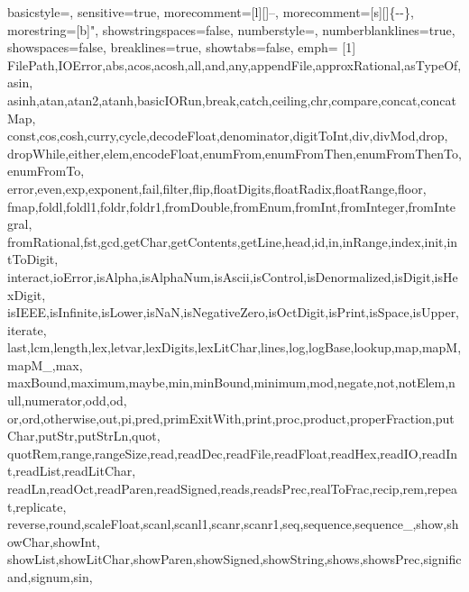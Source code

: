 \renewcommand{\ttdefault}{pcr}
 {
        basicstyle=\ttfamily\small,
        sensitive=true,
        morecomment=[l][\ttfamily\tiny]{--},
        morecomment=[s][\ttfamily\tiny]{\{-}{-\}},
        morestring=[b]",
        showstringspaces=false,
        numberstyle=\tiny,
        numberblanklines=true,
        showspaces=false,
        breaklines=true,
        showtabs=false,
        emph=
        {[1]
                FilePath,IOError,abs,acos,acosh,all,and,any,appendFile,approxRational,asTypeOf,asin,
                asinh,atan,atan2,atanh,basicIORun,break,catch,ceiling,chr,compare,concat,concatMap,
                const,cos,cosh,curry,cycle,decodeFloat,denominator,digitToInt,div,divMod,drop,
                dropWhile,either,elem,encodeFloat,enumFrom,enumFromThen,enumFromThenTo,enumFromTo,
                error,even,exp,exponent,fail,filter,flip,floatDigits,floatRadix,floatRange,floor,
                fmap,foldl,foldl1,foldr,foldr1,fromDouble,fromEnum,fromInt,fromInteger,fromIntegral,
                fromRational,fst,gcd,getChar,getContents,getLine,head,id,in,inRange,index,init,intToDigit,
                interact,ioError,isAlpha,isAlphaNum,isAscii,isControl,isDenormalized,isDigit,isHexDigit,
                isIEEE,isInfinite,isLower,isNaN,isNegativeZero,isOctDigit,isPrint,isSpace,isUpper,iterate,
                last,lcm,length,lex,letvar,lexDigits,lexLitChar,lines,log,logBase,lookup,map,mapM,mapM_,max,
                maxBound,maximum,maybe,min,minBound,minimum,mod,negate,not,notElem,null,numerator,odd,od,
                or,ord,otherwise,out,pi,pred,primExitWith,print,proc,product,properFraction,putChar,putStr,putStrLn,quot,
                quotRem,range,rangeSize,read,readDec,readFile,readFloat,readHex,readIO,readInt,readList,readLitChar,
                readLn,readOct,readParen,readSigned,reads,readsPrec,realToFrac,recip,rem,repeat,replicate,
                reverse,round,scaleFloat,scanl,scanl1,scanr,scanr1,seq,sequence,sequence_,show,showChar,showInt,
                showList,showLitChar,showParen,showSigned,showString,shows,showsPrec,significand,signum,sin,
}}
